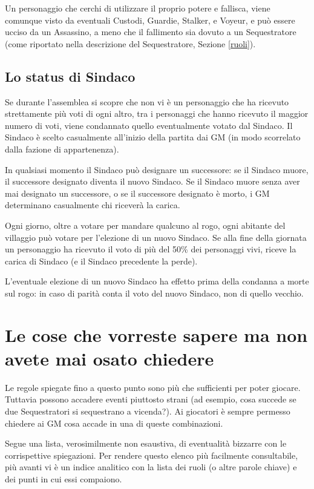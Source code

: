 \documentclass[a4paper,10pt]{article}
\begin{document}
Un personaggio che cerchi di utilizzare il proprio potere e fallisca, viene comunque visto da eventuali Custodi, Guardie, Stalker, e Voyeur, e può essere ucciso da un Assassino, a meno che il fallimento sia dovuto a un Sequestratore (come riportato nella descrizione del Sequestratore, Sezione \ref{ruoli}).

\subsection{Lo status di Sindaco}
\label{sindaco}

Se durante l'assemblea si scopre che non vi è un personaggio che ha ricevuto strettamente più voti di ogni altro, tra i personaggi che hanno ricevuto il maggior numero di voti, viene condannato quello eventualmente votato dal
Sindaco.
Il Sindaco è scelto casualmente all'inizio della partita dai GM (in modo scorrelato dalla fazione di appartenenza).

In qualsiasi momento il Sindaco può designare un successore: se il Sindaco muore, il successore designato diventa il nuovo Sindaco. Se il Sindaco muore senza aver mai designato un successore, o se il successore designato è morto, i GM determinano casualmente chi riceverà la carica.

Ogni giorno, oltre a votare per mandare qualcuno al rogo, ogni abitante del villaggio può votare per l'elezione di un nuovo Sindaco. Se alla fine della giornata un personaggio ha ricevuto il voto di più del 50\% dei personaggi vivi, riceve la carica di Sindaco (e il Sindaco precedente la perde).

L'eventuale elezione di un nuovo Sindaco ha effetto prima della condanna a morte sul rogo: in caso di parità conta il voto del nuovo Sindaco, non di quello vecchio.

\pagebreak

\section{Le cose che vorreste sapere ma non avete mai osato chiedere}
\label{faq}

Le regole spiegate fino a questo punto sono più che sufficienti per poter giocare. Tuttavia possono accadere eventi piuttosto strani (ad esempio, cosa succede se due Sequestratori si sequestrano a vicenda?). Ai giocatori è sempre permesso chiedere ai GM cosa accade in una di queste combinazioni.

Segue una lista, verosimilmente non esaustiva, di eventualità bizzarre con le corrispettive spiegazioni.
Per rendere questo elenco più facilmente consultabile, più avanti vi è un indice analitico con la lista dei ruoli (o altre parole chiave) e dei punti in cui essi compaiono.
\end{document}
